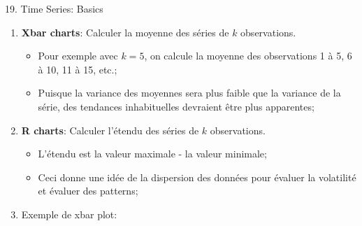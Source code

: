 \documentclass[12pt, titlepage, french]{report}
\begin{document}
\begin{CHPT_SUMM}[label = {timeseries19}]{19. Time Series: Basics}
\begin{enumerate}
\begin{itemize}
		\end{itemize}
	\item[]	\textbf{Xbar charts}: Calculer la moyenne des séries de $k$ observations.
		\begin{itemize}
		\item	Pour exemple avec $k = 5$, on calcule la moyenne des observations 1 à 5, 6 à 10, 11 à 15, etc.;
		\item	Puisque la variance des moyennes sera plus faible que la variance de la série, des tendances inhabituelles devraient être plus apparentes;
		\end{itemize}
	\item[]	\textbf{R charts}: Calculer l'étendu des séries de $k$ observations.
		\begin{itemize}
		\item	L'étendu est la valeur maximale - la valeur minimale;
		\item	Ceci donne une idée de la dispersion des données pour évaluer la volatilité et évaluer des patterns;
		\end{itemize}
	\item[]	Exemple de xbar plot:
	

\end{enumerate}
\end{CHPT_SUMM}
\end{document}
